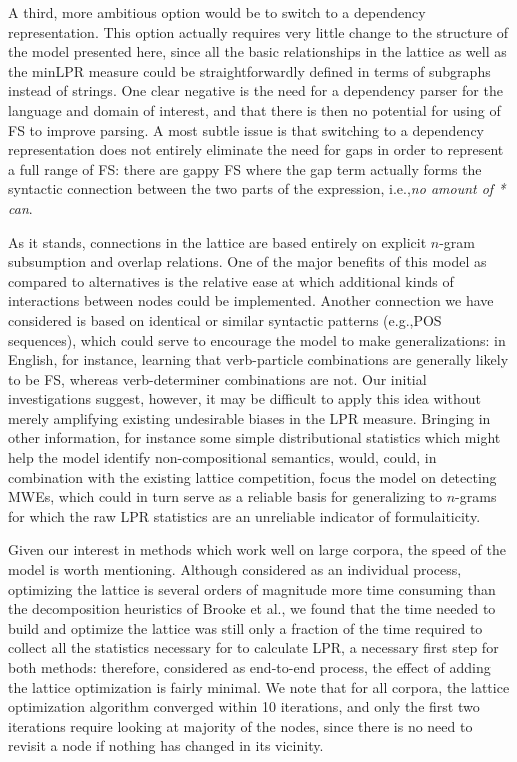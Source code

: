 \documentclass[11pt,letterpaper]{article}
\makeatletter
\def \eg {e.g.,\@ }
\def \ie {i.e.,\@ }
\def \al {al.\@ }
\newcommand{\ex}[1]{\textit{#1}\xspace}
\makeatother
\begin{document}
A third, more ambitious option would be to switch to a dependency representation. This option actually requires very little change to the structure of the model presented here, since all the basic relationships in the lattice as well as the minLPR measure could be straightforwardly defined in terms of subgraphs instead of strings. One clear negative is the need for a dependency parser for the language and domain of interest, and that there is then no potential for using of FS to improve parsing. A most subtle issue is that switching to a dependency representation does not entirely eliminate the need for gaps in order to represent a full range of FS: there are gappy FS where the gap term actually forms the syntactic connection between the two parts of the expression, \ie \ex{no amount of * can}.

As it stands, connections in the lattice are based entirely on explicit $n$-gram subsumption and overlap relations. One of the major benefits of this model as compared to alternatives is the relative ease at which additional kinds of interactions between nodes could be implemented. Another connection we have considered is based on identical or similar syntactic patterns (\eg POS sequences), which could serve to encourage the model to make generalizations: in English, for instance, learning that verb-particle combinations are generally likely to be FS, whereas verb-determiner combinations are not. Our initial investigations suggest, however, it may be difficult to apply this idea without merely amplifying existing undesirable biases in the LPR measure. Bringing in other information, for instance some simple distributional statistics which might help the model identify non-compositional semantics, would, could, in combination with the existing lattice competition, focus the model on detecting MWEs, which could in turn serve as a reliable basis for generalizing to $n$-grams for which the raw LPR statistics are an unreliable indicator of formulaiticity.

Given our interest in methods which work well on large corpora, the speed of the model is worth mentioning. Although considered as an individual process, optimizing the lattice is several orders of magnitude more time consuming than the decomposition heuristics of Brooke et \al {}, we found that the time needed to build and optimize the lattice was still only a fraction of the time required to collect all the statistics necessary for to calculate LPR, a necessary first step for both methods: therefore, considered as end-to-end process, the effect of adding the lattice optimization is fairly minimal. We note that for all corpora, the lattice optimization algorithm converged within 10 iterations, and only the first two iterations require looking at majority of the nodes, since there is no need to revisit a node if nothing has changed in its vicinity.
\end{document}
